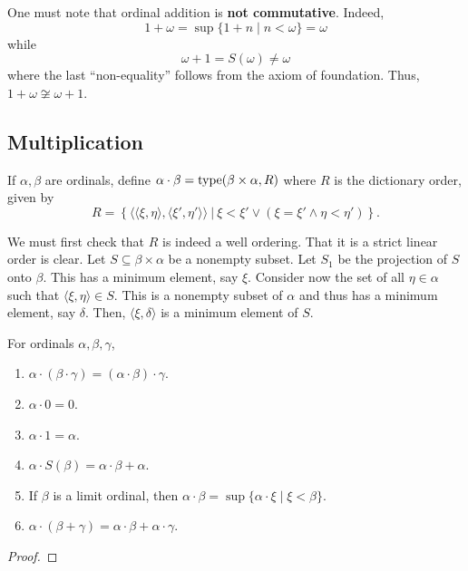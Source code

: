 \begin{remark}
    One must note that ordinal addition is \textbf{not commutative}. Indeed, 
    \begin{equation*}
        1 + \omega = \sup\{1 + n\mid n < \omega\} = \omega
    \end{equation*}
    while 
    \begin{equation*}
        \omega + 1 = S(\omega)\ne\omega
    \end{equation*}
    where the last ``non-equality'' follows from the axiom of foundation. Thus, $1 + \omega\not\cong\omega + 1$.
\end{remark}

\subsection*{Multiplication}

\begin{definition}
    If $\alpha,\beta$ are ordinals, define $\alpha\cdot\beta = \operatorname{type}(\beta\times\alpha, R)$ where $R$ is the dictionary order, given by 
    \begin{equation*}
        R = \left\{\langle\langle\xi,\eta\rangle,\langle\xi',\eta'\rangle\rangle~\big\vert~\xi < \xi'\vee (\xi = \xi'\wedge\eta < \eta')\right\}.
    \end{equation*}
\end{definition}

We must first check that $R$ is indeed a well ordering. That it is a strict linear order is clear. Let $S\subseteq\beta\times\alpha$ be a nonempty subset. Let $S_1$ be the projection of $S$ onto $\beta$. This has a minimum element, say $\xi$. Consider now the set of all $\eta\in\alpha$ such that $\langle\xi,\eta\rangle\in S$. This is a nonempty subset of $\alpha$ and thus has a minimum element, say $\delta$. Then, $\langle\xi,\delta\rangle$ is a minimum element of $S$.

\begin{lemma}
    For ordinals $\alpha,\beta,\gamma$, 
    \begin{enumerate}[label=(\alph*)]
        \item $\alpha\cdot(\beta\cdot\gamma) = (\alpha\cdot\beta)\cdot\gamma$.
        \item $\alpha\cdot 0 = 0$.
        \item $\alpha\cdot 1 = \alpha$. 
        \item $\alpha\cdot S(\beta) = \alpha\cdot\beta + \alpha$. 
        \item If $\beta$ is a limit ordinal, then $\alpha\cdot\beta = \sup\{\alpha\cdot\xi\mid\xi < \beta\}$. 
        \item $\alpha\cdot(\beta + \gamma) = \alpha\cdot\beta + \alpha\cdot\gamma$.
    \end{enumerate}
\end{lemma}
\begin{proof}
\end{proof}

